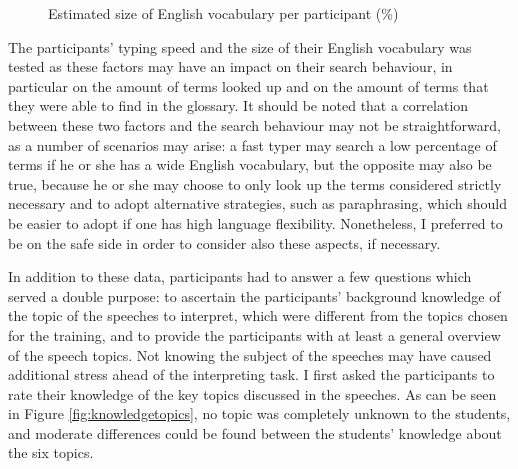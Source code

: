 \begin{figure}
\caption[Participants' size of English vocabulary]{Estimated size of English vocabulary per participant (\%)}
\label{fig:ENvocab}
\end{figure}

The participants' typing speed and the size of their English vocabulary was tested as these factors may have an impact on their search behaviour, in particular on the amount of terms looked up and on the amount of terms that they were able to find in the glossary. It should be noted that a correlation between these two factors and the search behaviour may not be straightforward, as a number of scenarios may arise: a fast typer may search a low percentage of terms if he or she has a wide English vocabulary, but the opposite may also be true, because he or she may choose to only look up the terms considered strictly necessary and to adopt alternative strategies, such as paraphrasing, which should be easier to adopt if one has high language flexibility. Nonetheless, I preferred to be on the safe side in order to consider also these aspects, if necessary.

 \label{speechtop_MS}
In addition to these data, participants had to answer a few questions which served a double purpose: to ascertain the participants' background knowledge of the topic of the speeches to interpret, which were different from the topics chosen for the training, and to provide the participants with at least a general overview of the speech topics. Not knowing the subject of the speeches may have caused additional stress ahead of the interpreting task. I first asked the participants to rate their knowledge of the key topics discussed in the speeches. As can be seen in Figure \ref{fig:knowledgetopics}, no topic was completely unknown to the students, and moderate differences could be found between the students' knowledge about the six topics.

